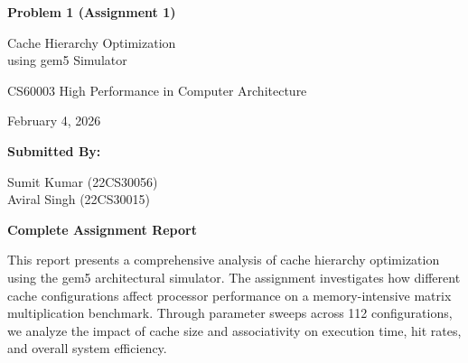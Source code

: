 \documentclass[11pt,a4paper]{article}
\begin{document}
\begin{titlepage}
    \centering
    \vspace*{1cm}

    {\Huge\bfseries Problem 1 (Assignment 1)\par}
    \vspace{0.5cm}
    {\LARGE Cache Hierarchy Optimization\\using gem5 Simulator\par}
    \vspace{2cm}
    {\Large CS60003 High Performance in Computer Architecture\par}
    \vspace{0.5cm}
    {\large February 4, 2026\par}
    \vspace{1.5cm}

    {\large\bfseries Submitted By:\par}
    \vspace{0.5cm}
    {\large
    Sumit Kumar (22CS30056)\\
    Aviral Singh (22CS30015)
    \par}
    \vfill

    {\large\bfseries Complete Assignment Report\par}
    \vspace{0.3cm}
    \begin{minipage}{0.85\textwidth}
        \small
        This report presents a comprehensive analysis of cache hierarchy optimization using the gem5 architectural simulator. The assignment investigates how different cache configurations affect processor performance on a memory-intensive matrix multiplication benchmark. Through parameter sweeps across 112 configurations, we analyze the impact of cache size and associativity on execution time, hit rates, and overall system efficiency.
    \end{minipage}

    \vfill

\end{titlepage}
\end{document}
